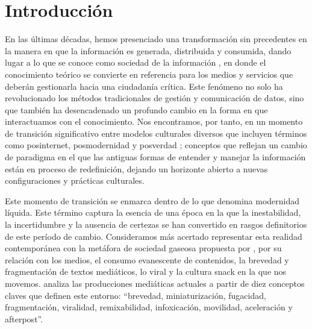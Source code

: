 \documentclass[spanish]{textolivre}
\begin{document}
\begin{polyabstract}
\begin{english}
\begin{abstract}
\end{abstract}
\end{english}
\end{polyabstract}

\section{Introducción}
En las últimas décadas, hemos presenciado una transformación sin precedentes en la manera en que la información es generada, distribuida y consumida, dando lugar a lo que se conoce como sociedad de la información \cite{bell_coming_1973}, en donde el conocimiento teórico se convierte en referencia para los medios y servicios que deberán gestionarla hacia una ciudadanía crítica.  Este fenómeno no solo ha revolucionado los métodos tradicionales de gestión y comunicación de datos, sino que también ha desencadenado un profundo cambio en la forma en que interactuamos con el conocimiento. Nos encontramos, por tanto, en un momento de transición significativo entre modelos culturales diversos que incluyen términos como posinternet, posmodernidad y posverdad \cite{tabernero_formar_2022a}; conceptos que reflejan un cambio de paradigma en el que las antiguas formas de entender y manejar la información están en proceso de redefinición, dejando un horizonte abierto a nuevas configuraciones y prácticas culturales.

Este momento de transición se enmarca dentro de lo que \textcite{bauman_modernidad_2004,bauman_acerca_2019} denomina modernidad líquida. Este término captura la esencia de una época en la que la inestabilidad, la incertidumbre y la ausencia de certezas se han convertido en rasgos definitorios de este período de cambio. Consideramos más acertado representar esta realidad contemporánea con la metáfora de sociedad gaseosa propuesta por \textcite{scolari_cultura_2021}, por su relación con los medios, el consumo evanescente de contenidos, la brevedad y fragmentación de textos mediáticos, lo viral y la cultura snack en la que nos movemos. \textcite[p. 157]{scolari_cultura_2021} analiza las producciones mediáticas actuales a partir de diez conceptos claves que definen este entorno: “brevedad, miniaturización, fugacidad, fragmentación, viralidad, remixabilidad, infoxicación, movilidad, aceleración y afterpost”.
\end{document}
